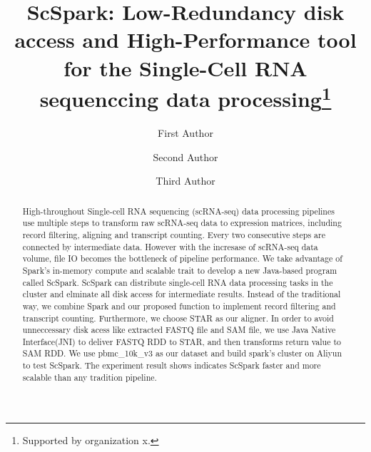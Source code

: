 \documentclass[runningheads]{llncs}
\begin{document}
%
\title{ScSpark: Low-Redundancy disk access and High-Performance tool for the Single-Cell RNA sequenccing data processing\thanks{Supported by organization x.}}
%
%
\author{First Author \and
Second Author \and
Third Author}
%
%
%
\maketitle              %
%
\begin{abstract}
High-throughout Single-cell RNA sequencing
  (scRNA-seq) data processing pipelines use multiple steps to transform raw scRNA-seq data to expression matrices, including record filtering, aligning and transcript counting.
Every two consecutive steps are connected by intermediate data.
However with the incresase of scRNA-seq data volume, file IO becomes the bottleneck of pipeline performance.
We take advantage of Spark's in-memory compute and scalable trait to develop a new Java-based program called ScSpark.
ScSpark can distribute single-cell RNA data processing tasks in the cluster and elminate all disk access for intermediate results.
Instead of the traditional way, we combine Spark and our proposed function to implement record filtering and transcript counting.
Furthermore, we choose STAR as our aligner.
In order to avoid unneccessary disk acess like extracted FASTQ file and SAM file, we use Java Native Interface(JNI) to deliver FASTQ RDD to STAR, and then transforms return value to SAM RDD.
We use pbmc\_10k\_v3 as our dataset and build spark's cluster on Aliyun to test ScSpark.
The experiment result shows indicates ScSpark faster and more scalable than any tradition pipeline.
\end{abstract}
\end{document}
